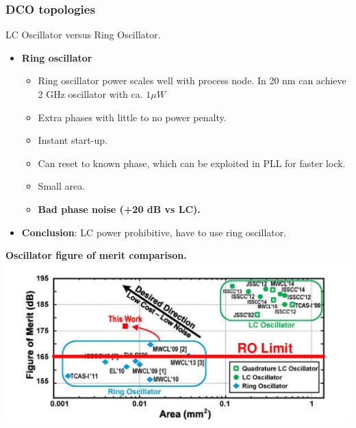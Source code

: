 \documentclass[t, screen, aspectratio=43]{beamer}
\begin{document}
\begin{frame}
	\frametitle{DCO topologies}
	\begin{block}{LC Oscillator versus Ring Oscillator.}
	\begin{minipage}{6cm}
		\vspace{1em}
		\begin{itemize}
			\scriptsize
			\item \textbf{Ring oscillator}
			\begin{itemize}
				\scriptsize
				\item Ring oscillator power scales well with process node. In 20 nm can achieve 2 GHz oscillator with ca. $1 \mu W$
				\item Extra phases with little to no power penalty.
				\item Instant start-up.
				\item Can reset to known phase, which can be exploited in PLL for faster lock.
				\item Small area.
				\item \textbf{Bad phase noise (+20 dB vs LC).}
			\end{itemize}
		\item \textbf{Conclusion}: LC power prohibitive, have to use ring oscillator.
		\end{itemize} 	
		\end{minipage}
		\begin{minipage}{5cm}
				\vspace{1em}
			\tiny
			\textbf{Oscillator figure of merit comparison.}
			\center\includegraphics[width=1\textwidth, angle=0]{ro_perf.pdf}
		\end{minipage}
	\end{block}
\end{frame}
\end{document}
